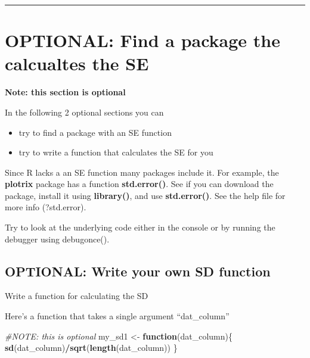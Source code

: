 \documentclass[]{book}
\newenvironment{Shaded}{\begin{snugshade}}{\end{snugshade}}
\newcommand{\KeywordTok}[1]{\textcolor[rgb]{0.13,0.29,0.53}{\textbf{#1}}}
\newcommand{\StringTok}[1]{\textcolor[rgb]{0.31,0.60,0.02}{#1}}
\newcommand{\CommentTok}[1]{\textcolor[rgb]{0.56,0.35,0.01}{\textit{#1}}}
\newcommand{\ControlFlowTok}[1]{\textcolor[rgb]{0.13,0.29,0.53}{\textbf{#1}}}
\newcommand{\OperatorTok}[1]{\textcolor[rgb]{0.81,0.36,0.00}{\textbf{#1}}}
\newcommand{\NormalTok}[1]{#1}
\providecommand{\tightlist}{%
  \setlength{\itemsep}{0pt}\setlength{\parskip}{0pt}}
\theoremstyle{definition}
\theoremstyle{definition}
\theoremstyle{definition}
\theoremstyle{remark}
\begin{document}
\begin{Shaded}
\end{Shaded}

\begin{center}\rule{0.5\linewidth}{\linethickness}\end{center}

\section{OPTIONAL: Find a package the calcualtes the
SE}\label{optional-find-a-package-the-calcualtes-the-se}

\textbf{Note: this section is optional}

In the following 2 optional sections you can

\begin{itemize}
\tightlist
\item
  try to find a package with an SE function
\item
  try to write a function that calculates the SE for you
\end{itemize}

Since R lacks a an SE function many packages include it. For example,
the \textbf{plotrix} package has a function \textbf{std.error()}. See if
you can download the package, install it using \textbf{library()}, and
use \textbf{std.error()}. See the help file for more info (?std.error).

Try to look at the underlying code either in the console or by running
the debugger using debugonce().

\subsection{OPTIONAL: Write your own SD
function}\label{optional-write-your-own-sd-function}

Write a function for calculating the SD

Here's a function that takes a single argument ``dat\_column''

\begin{Shaded}
\begin{Highlighting}[]
\CommentTok{#NOTE: this is optional}
\NormalTok{my_sd1 <-}\StringTok{ }\ControlFlowTok{function}\NormalTok{(dat_column)\{}
  \KeywordTok{sd}\NormalTok{(dat_column)}\OperatorTok{/}\KeywordTok{sqrt}\NormalTok{(}\KeywordTok{length}\NormalTok{(dat_column))}
\NormalTok{\}}
\end{Highlighting}
\end{Shaded}
\end{document}
